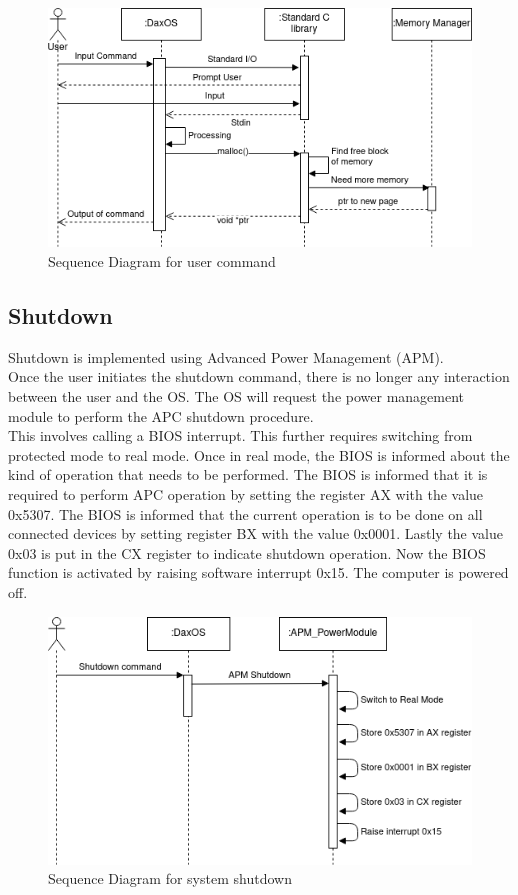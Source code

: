 \begin{figure}[h!]
	\includegraphics[width=\textwidth,height=\textheight,keepaspectratio]{user_command}
	\caption{Sequence Diagram for user command}
\end{figure}

\pagebreak
\subsection{Shutdown}
\begin{flushleft}
	Shutdown is implemented using Advanced Power Management (APM).\\
	Once the user initiates the shutdown command, there is no longer any interaction 
	between the user and the OS. The OS will request the power management module to perform the APC shutdown procedure.\\
	This involves calling a BIOS interrupt. This further requires switching from protected mode to real mode. 
	Once in real mode, the BIOS is informed about the kind of operation that needs to be performed.
	The BIOS is informed that it is required to perform APC operation by setting the
	register AX with the value 0x5307. The BIOS is informed that the current operation is to be done on all connected
	devices by setting register BX with the value 0x0001. Lastly the value 0x03 is put in the CX register to indicate shutdown
	operation. Now the BIOS function is activated by raising software interrupt 0x15.
	The computer is powered off.
\end{flushleft}
\vspace{1.5 cm}
\begin{figure}[h!]
	\includegraphics[width=\textwidth,height=\textheight,keepaspectratio]{shutdown}
	\caption{Sequence Diagram for system shutdown}
\end{figure}